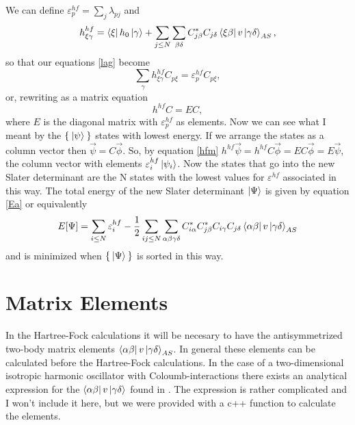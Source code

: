 \documentclass[a4paper,english,12pt]{article}
\newcommand{\be}{\begin{equation}}
\newcommand{\ee}{\end{equation}}
\renewcommand{\epsilon}{\varepsilon}
\begin{document}
We can define \( \epsilon_p^{hf}=\sum_j\lambda_{pj} \) and
\be\label{hfd}
 h_{\xi\gamma}^{hf}=\bra{\xi}h_0\ket{\gamma}+\sum_{j\leq N}\sum_{\beta\delta}C_{j\beta}^*C_{j\delta}\bra{\xi\beta}v\ket{\gamma\delta}_{AS},
\ee
so that our equations \ref{lag} become
\be\label{hfi}
\sum_\gamma h_{\xi\gamma}^{hf}C_{p\xi} = \epsilon^{hf}_{p}C_{p\xi},
\ee
or, rewriting as a matrix equation
\be\label{hfm}
h^{hf}C = E C,
\ee
where $E$ is the diagonal matrix with $\epsilon^{hf}_p$ as elements.
Now we can see what I meant by the $\Set{\Ket{\psi}}$ states with lowest energy. If we arrange the states as a column vector then
\(\vec{\psi} = C\vec{\phi}\). So, by equation \ref{hfm} \(h^{hf}\vec{\psi} = h^{hf}C\vec{\phi} = EC\vec{\phi} = E\vec{\psi}\), the column vector with elements
\(\epsilon^{hf}_i\ket{\psi_i}\). Now the states that go into the new Slater determinant are the N states with the lowest values for $\epsilon^{hf}$ associated in this way.
The total energy of the new Slater determinant \(\Ket{\Psi}\) is given by equation \ref{Ea} or equivalently
\be\label{Ep}
E[\Psi] = \sum_{i\leq N}\epsilon^{hf}_i -
\frac{1}{2}\sum_{ij\leq N}\sum_{\alpha\beta\gamma\delta}C_{i\alpha}^*C_{j\beta}^*C_{i\gamma}C_{j\delta}\bra{\alpha\beta}v\ket{\gamma\delta}_{AS}
\ee
and is minimized when $\Set{\Ket{\Psi}}$ is sorted in this way.

\section{Matrix Elements}
In the Hartree-Fock calculations it will be necesary to have the antisymmetrized two-body matrix elements $\bra{\alpha\beta}v\ket{\gamma\delta}_{AS}$.
In general these elements can be calculated before the Hartree-Fock calculations. In the case of a two-dimensional isotropic harmonic oscillator
with Coloumb-interactions there exists an analytical expression for the $\bra{\alpha\beta}v\ket{\gamma\delta}$ found in \cite{analytho}. The expression is rather complicated and I won't
include it here, but we were provided with a c++ function to calculate the elements.

  
\end{document}
